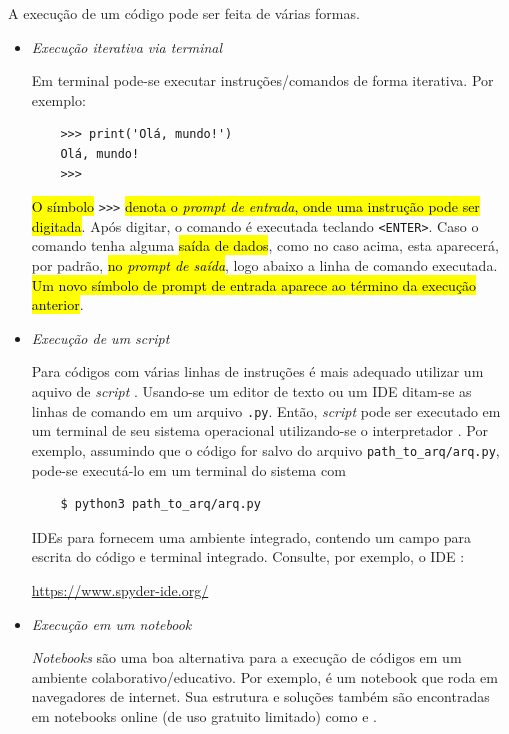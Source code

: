 A execução de um código {\python} pode ser feita de várias formas.

\begin{itemize}
\item \emph{Execução iterativa via terminal}

  Em terminal {\python} pode-se executar instruções/comandos de forma iterativa. Por exemplo:
  \begin{lstlisting}
    >>> print('Olá, mundo!')
    Olá, mundo!
    >>> 
  \end{lstlisting}

  \hl{O símbolo }\lstinline+>>>+\hl{ denota o \emph{prompt de entrada}, onde uma instrução {\python} pode ser digitada}. Após digitar, o comando é executada teclando \lstinline+<ENTER>+. Caso o comando tenha alguma \hl{saída de dados}, como no caso acima, esta aparecerá, por padrão, \hl{no \emph{prompt de saída}}, logo abaixo a linha de comando executada. \hl{Um novo símbolo de prompt de entrada aparece ao término da execução anterior}.

\item \emph{Execução de um {\it script}}

  Para códigos com várias linhas de instruções é mais adequado utilizar um aquivo de {\it script} {\python}. Usando-se um editor de texto ou um IDE ditam-se as linhas de comando em um arquivo \lstinline+.py+. Então, {\it script} pode ser executado em um terminal de seu sistema operacional utilizando-se o interpretador {\python}. Por exemplo, assumindo que o código for salvo do arquivo \lstinline+path_to_arq/arq.py+, pode-se executá-lo em um terminal do sistema com
  \begin{lstlisting}
    $ python3 path_to_arq/arq.py 
  \end{lstlisting}%
  

  IDEs para {\python} fornecem uma ambiente integrado, contendo um campo para escrita do código e terminal {\python} integrado. Consulte, por exemplo, o IDE {\spyder}:
  \begin{center}
    \url{https://www.spyder-ide.org/}
  \end{center}

\item \emph{Execução em um {\it notebook}}

  {\it Notebooks} {\python} são uma boa alternativa para a execução de códigos em um ambiente colaborativo/educativo. Por exemplo, {\jupyter} é um notebook que roda em navegadores de internet. Sua estrutura e soluções também são encontradas em notebooks online (de uso gratuito limitado) como {\colab} e {\kaggle}.  
\end{itemize}

